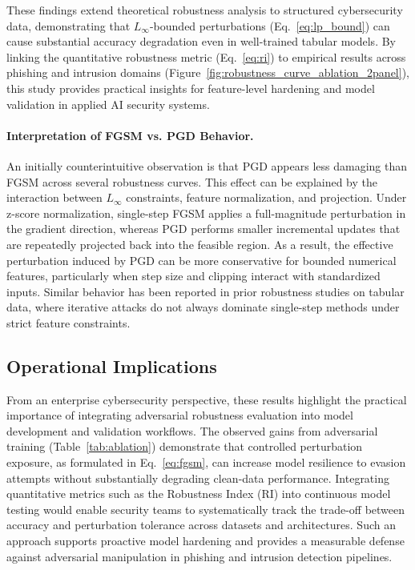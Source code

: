 \documentclass[a4paper,twoside]{article}
\begin{document}
These findings extend theoretical robustness analysis to structured cybersecurity data,
demonstrating that $L_\infty$-bounded perturbations (Eq.~\ref{eq:lp_bound})
can cause substantial accuracy degradation even in well-trained tabular models.
By linking the quantitative robustness metric (Eq.~\ref{eq:ri}) to empirical results
across phishing and intrusion domains (Figure~\ref{fig:robustness_curve_ablation_2panel}),
this study provides practical insights for feature-level hardening and model validation
in applied AI security systems.

\paragraph{Interpretation of FGSM vs. PGD Behavior.}
An initially counterintuitive observation is that PGD appears less damaging than FGSM across several robustness curves.
This effect can be explained by the interaction between $L_\infty$ constraints, feature normalization, and projection.
Under z-score normalization, single-step FGSM applies a full-magnitude perturbation in the gradient direction,
whereas PGD performs smaller incremental updates that are repeatedly projected back into the feasible region.
As a result, the effective perturbation induced by PGD can be more conservative for bounded numerical features,
particularly when step size and clipping interact with standardized inputs.
Similar behavior has been reported in prior robustness studies on tabular data,
where iterative attacks do not always dominate single-step methods under strict feature constraints.

\subsection{Operational Implications}

From an enterprise cybersecurity perspective, these results highlight the practical importance 
of integrating adversarial robustness evaluation into model development and validation workflows. 
The observed gains from adversarial training (Table~\ref{tab:ablation}) demonstrate that controlled 
perturbation exposure, as formulated in Eq.~\ref{eq:fgsm}, can increase model resilience to evasion attempts 
without substantially degrading clean-data performance. 
Integrating quantitative metrics such as the Robustness Index (RI) into continuous model testing 
would enable security teams to systematically track the trade-off between accuracy and 
perturbation tolerance across datasets and architectures. 
Such an approach supports proactive model hardening and provides a measurable defense 
against adversarial manipulation in phishing and intrusion detection pipelines.
\end{document}
